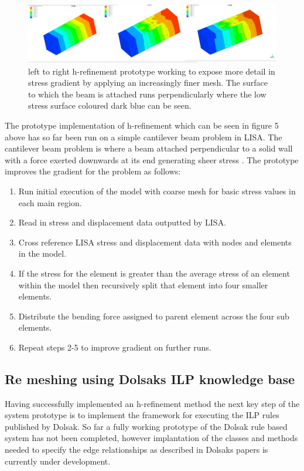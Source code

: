 \documentclass{article}
\begin{document}
\begin{figure}[!h]
  \centerline{\includegraphics[width=180mm, scale=1]{H-refinementImplementation.jpg}}
  \caption{left to right h-refinement prototype working to expose more detail in stress gradient by applying an increasingly finer mesh. The surface to which the beam is attached runs perpendicularly where the low stress surface coloured dark blue can be seen.}
  \label{fig:h-refinementImp}
\end{figure}

\newpage
\noindent
The prototype implementation of h-refinement which can be seen in figure 5 above has so far been run on a simple cantilever beam problem in LISA. The cantilever beam problem is where a beam attached perpendicular to a solid wall with a force exerted downwards at its end generating sheer stress \cite{cantileverBeam}. The prototype improves the gradient for the problem as follows:

\begin{enumerate}
\item Run initial execution of the model with coarse mesh for basic stress values in each main region.
\item Read in stress and displacement data outputted by LISA.
\item Cross reference LISA stress and displacement data with nodes and elements in the model.
\item If the stress for the element is greater than the average stress of an element within the model then recursively split that element into four smaller elements.
\item Distribute the bending force assigned to parent element across the four sub elements.
\item Repeat steps 2-5 to improve gradient on further runs.
\end{enumerate}


\subsection{Re meshing using Dolsaks ILP knowledge base}
Having successfully implemented an h-refinement method the next key step of the system prototype is to implement the framework for executing the ILP rules published by Dolsak.  So far a fully working prototype of the Dolsak rule based system has not been completed, however implantation of the classes and methods needed to specify the edge relationships as described in Dolsaks papers \cite{DolsakPaper91, DolsakPaper94, appOfILPToFEMeshDesign} \cite{ConsultRuleIntelltSystemFE} is currently under development.
\end{document}
